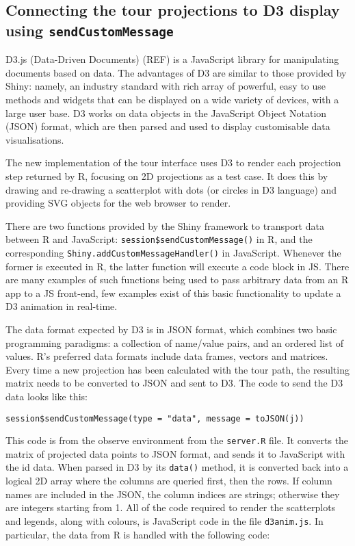 \subsection{Connecting the tour projections to D3 display using
\texttt{sendCustomMessage}}\label{connecting-the-tour-projections-to-d3-display-using-sendcustommessage}

D3.js (Data-Driven Documents) (REF) is a JavaScript library for
manipulating documents based on data. The advantages of D3 are similar
to those provided by Shiny: namely, an industry standard with rich array
of powerful, easy to use methods and widgets that can be displayed on a
wide variety of devices, with a large user base. D3 works on data
objects in the JavaScript Object Notation (JSON) format, which are then
parsed and used to display customisable data visualisations.

The new implementation of the tour interface uses D3 to render each
projection step returned by R, focusing on 2D projections as a test
case. It does this by drawing and re-drawing a scatterplot with dots (or
circles in D3 language) and providing SVG objects for the web browser to
render.

There are two functions provided by the Shiny framework to transport
data between R and JavaScript: \texttt{session\$sendCustomMessage()} in
R, and the corresponding \texttt{Shiny.addCustomMessageHandler()} in
JavaScript. Whenever the former is executed in R, the latter function
will execute a code block in JS. There are many examples of such
functions being used to pass arbitrary data from an R app to a JS
front-end, few examples exist of this basic functionality to update a D3
animation in real-time.

The data format expected by D3 is in JSON format, which combines two
basic programming paradigms: a collection of name/value pairs, and an
ordered list of values. R's preferred data formats include data frames,
vectors and matrices. Every time a new projection has been calculated
with the tour path, the resulting matrix needs to be converted to JSON
and sent to D3. The code to send the D3 data looks like this:

\begin{verbatim}
session$sendCustomMessage(type = "data", message = toJSON(j))
\end{verbatim}

This code is from the observe environment from the \texttt{server.R}
file. It converts the matrix of projected data points to JSON format,
and sends it to JavaScript with the id data. When parsed in D3 by its
\texttt{data()} method, it is converted back into a logical 2D array
where the columns are queried first, then the rows. If column names are
included in the JSON, the column indices are strings; otherwise they are
integers starting from 1. All of the code required to render the
scatterplots and legends, along with colours, is JavaScript code in the
file \texttt{d3anim.js}. In particular, the data from R is handled with
the following code:

